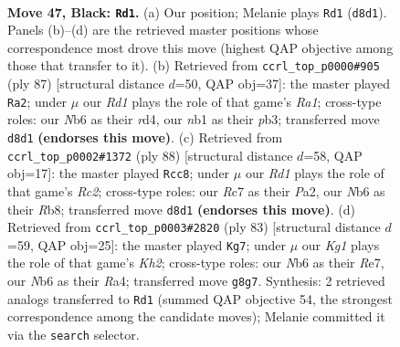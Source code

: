 \documentclass[11pt]{article}
\begin{document}
\clearpage

\begin{figure}[p]\centering
\begin{subfigure}{0.46\textwidth}\centering
\resizebox{\linewidth}{!}{%
\newchessgame
\chessboard[
  setfen={3r2k1/2r2p1p/1n4p1/p3p1P1/P3P3/1P3KRP/6P1/RN6 b - - 9 47},
  showmover=false,
  pgfstyle=straightmove, color=movearrow, markmove={d8-d1}
]}
\caption{}
\end{subfigure}\hfill
\begin{subfigure}{0.46\textwidth}\centering
\resizebox{\linewidth}{!}{%
\newchessgame
\chessboard[
  setfen={r7/4k3/2pp2p1/1r5p/1p1RP2P/1P3PP1/2P2RK1/8 b - - 2 44},
  showmover=false,
  pgfstyle=straightmove, color=movearrow, markmove={a8-a2}
]}
\caption{}
\end{subfigure}
\\[4pt]
\begin{subfigure}{0.46\textwidth}\centering
\resizebox{\linewidth}{!}{%
\newchessgame
\chessboard[
  setfen={1R6/3r1p1k/p3pP1p/1p1r2pP/6P1/1P6/P1R3K1/8 w - - 10 45},
  showmover=false,
  pgfstyle=straightmove, color=movearrow, markmove={c2-c8}
]}
\caption{}
\end{subfigure}\hfill
\begin{subfigure}{0.46\textwidth}\centering
\resizebox{\linewidth}{!}{%
\newchessgame
\chessboard[
  setfen={3R4/4rp1k/6p1/p6p/rp2P2P/5PK1/P2R2P1/8 b - - 3 42},
  showmover=false,
  pgfstyle=straightmove, color=movearrow, markmove={h7-g7}
]}
\caption{}
\end{subfigure}
\caption{\textbf{Move 47, Black: \texttt{Rd1}.} (a) Our position; Melanie plays \texttt{Rd1} (\texttt{d8d1}). Panels (b)--(d) are the retrieved master positions whose correspondence most drove this move (highest QAP objective among those that transfer to it). (b) Retrieved from \texttt{ccrl\_top\_p0000\#905} (ply 87) [structural distance $d$=50, QAP obj=37]: the master played \texttt{Ra2}; under $\mu$ our \emph{Rd1} plays the role of that game's \emph{Ra1}; cross-type roles: our \emph{N}b6 as their \emph{r}d4, our \emph{n}b1 as their \emph{p}b3; transferred move \texttt{d8d1} \textbf{(endorses this move)}. (c) Retrieved from \texttt{ccrl\_top\_p0002\#1372} (ply 88) [structural distance $d$=58, QAP obj=17]: the master played \texttt{Rcc8}; under $\mu$ our \emph{Rd1} plays the role of that game's \emph{Rc2}; cross-type roles: our \emph{R}c7 as their \emph{P}a2, our \emph{N}b6 as their \emph{R}b8; transferred move \texttt{d8d1} \textbf{(endorses this move)}. (d) Retrieved from \texttt{ccrl\_top\_p0003\#2820} (ply 83) [structural distance $d$=59, QAP obj=25]: the master played \texttt{Kg7}; under $\mu$ our \emph{Kg1} plays the role of that game's \emph{Kh2}; cross-type roles: our \emph{N}b6 as their \emph{R}e7, our \emph{N}b6 as their \emph{R}a4; transferred move \texttt{g8g7}. Synthesis: 2 retrieved analogs transferred to \texttt{Rd1} (summed QAP objective 54, the strongest correspondence among the candidate moves); Melanie committed it via the \texttt{search} selector.}
\label{fig:thought-m93}
\end{figure}
\end{document}
